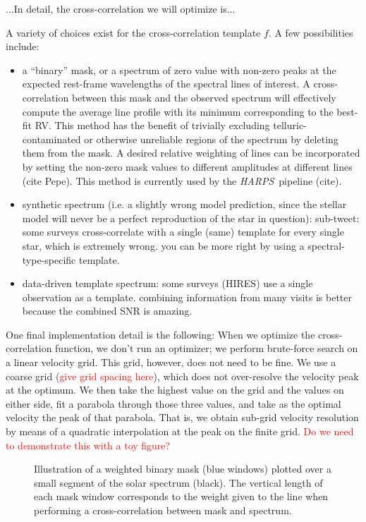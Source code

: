 \documentclass[modern]{aastex62}
\newcommand{\todo}[1]{\textcolor{red}{#1}}  %
\newcommand{\acronym}[1]{{\small{#1}}}
\newcommand{\project}[1]{\textsl{#1}}
\newcommand{\HARPS}{\project{\acronym{HARPS}}}
\begin{document}
...In detail, the cross-correlation we will optimize is...

A variety of choices exist for the cross-correlation template $f$. A few possibilities include:
\begin{itemize}
\item a ``binary'' mask, or a spectrum of zero value with non-zero peaks at the expected rest-frame wavelengths of the spectral lines of interest. A cross-correlation between this mask and the observed spectrum will effectively compute the average line profile with its minimum corresponding to the best-fit RV. This method has the benefit of trivially excluding telluric-contaminated or otherwise unreliable regions of the spectrum by deleting them from the mask. A desired relative weighting of lines can be incorporated by setting the non-zero mask values to different amplitudes at different lines (cite Pepe). This method is currently used by the \HARPS\ pipeline (cite).
\item synthetic spectrum (i.e. a slightly wrong model prediction, since the stellar model will never be a perfect reproduction of the star in question): sub-tweet: some surveys cross-correlate with a single (same) template for every single star, which is extremely wrong. you can be more right by using a spectral-type-specific template.
\item data-driven template spectrum: some surveys (HIRES) use a single observation as a template. combining information from many visits is better because the combined SNR is amazing.
\end{itemize}

One final implementation detail is the following:
When we optimize the cross-correlation function, we don't run an optimizer;
we perform brute-force search on a linear velocity grid.
This grid, however, does not need to be fine.
We use a coarse grid (\todo{give grid spacing here}), which does not
over-resolve the velocity peak at the optimum.
We then take the highest value on the grid and the values on either
side, fit a parabola through those three values, and take as the optimal
velocity the peak of that parabola.
That is, we obtain sub-grid velocity resolution by means of a quadratic
interpolation at the peak on the finite grid.
\todo{Do we need to demonstrate this with a toy figure?}

\begin{figure}
\centering
\caption{Illustration of a weighted binary mask (blue windows) plotted over a small segment of the solar spectrum (black). The vertical length of each mask window corresponds to the weight given to the line when performing a cross-correlation between mask and spectrum.}
\label{fig:binarymask}
\end{figure}
\end{document}
